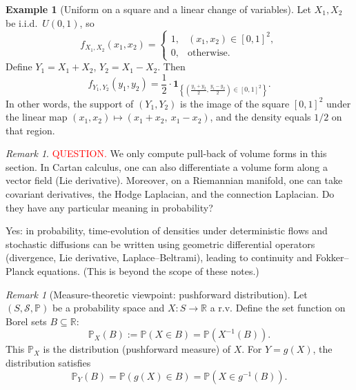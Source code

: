 \documentclass[11pt]{article}
\theoremstyle{plain}
\theoremstyle{definition}
\newtheorem{example}[theorem]{Example}
\theoremstyle{remark}
\newtheorem{remark}[theorem]{Remark}
\begin{document}
	\begin{example}[Uniform on a square and a linear change of variables]
		Let \(X_1,X_2\) be i.i.d.\ \(U(0,1)\), so
		\[
		f_{X_1,X_2}(x_1,x_2)=
		\begin{cases}
			1, & (x_1,x_2)\in[0,1]^2,\\
			0, & \text{otherwise}.
		\end{cases}
		\]
		Define \(Y_1=X_1+X_2\), \(Y_2=X_1-X_2\). Then
		\[
		f_{Y_1,Y_2}(y_1,y_2)=\frac12\cdot \mathbf{1}_{\left\{\left(\frac{y_1+y_2}{2},\frac{y_1-y_2}{2}\right)\in[0,1]^2\right\}}.
		\]
		In other words, the support of \((Y_1,Y_2)\) is the image of the square \([0,1]^2\)
		under the linear map \((x_1,x_2)\mapsto (x_1+x_2,\ x_1-x_2)\), and the density equals \(1/2\) on that region.
	\end{example}
	
	
	\begin{remark}
		\textcolor{red}{QUESTION.}
		We only compute pull-back of volume forms in this section. In Cartan calculus, one can also differentiate a volume form
		along a vector field (Lie derivative). Moreover, on a Riemannian manifold, one can take covariant derivatives, the Hodge
		Laplacian, and the connection Laplacian. Do they have any particular meaning in probability?
		
		Yes: in probability, time-evolution of densities under deterministic flows and stochastic diffusions can be written using
		geometric differential operators (divergence, Lie derivative, Laplace--Beltrami), leading to continuity and Fokker--Planck
		equations. (This is beyond the scope of these notes.)
	\end{remark}
	
	
	\begin{remark}[Measure-theoretic viewpoint: pushforward distribution]
		Let \((S,\mathcal{S},\mathbb{P})\) be a probability space and \(X:S\to\mathbb{R}\) a r.v.
		Define the set function on Borel sets \(B\subseteq\mathbb{R}\):
		\[
		\mathbb{P}_X(B):=\mathbb{P}(X\in B)=\mathbb{P}(X^{-1}(B)).
		\]
		This \(\mathbb{P}_X\) is the distribution (pushforward measure) of \(X\).
		For \(Y=g(X)\), the distribution satisfies
		\[
		\mathbb{P}_Y(B)=\mathbb{P}(g(X)\in B)=\mathbb{P}(X\in g^{-1}(B)).
		\]
	\end{remark}
	
	
	
\end{document}
